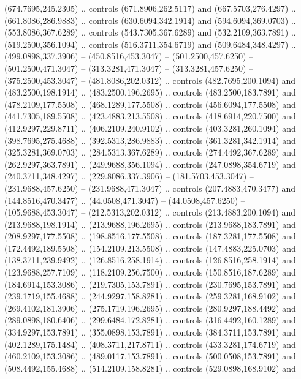 {{\begin{scope}[y=-0.80pt,x=0.80pt,scale=0.038,xshift=-420pt,yshift=250pt]
        (674.7695,245.2305) .. controls (671.8906,262.5117) and (667.5703,276.4297) ..
        (661.8086,286.9883) .. controls (630.6094,342.1914) and (594.6094,369.0703) ..
        (553.8086,367.6289) .. controls (543.7305,367.6289) and (532.2109,363.7891) ..
        (519.2500,356.1094) .. controls (516.3711,354.6719) and (509.6484,348.4297) ..
        (499.0898,337.3906) -- (450.8516,453.3047) -- (501.2500,457.6250) --
        (501.2500,471.3047) -- (313.3281,471.3047) -- (313.3281,457.6250) --
        (375.2500,453.3047) -- (481.8086,202.0312) .. controls (482.7695,200.1094) and
        (483.2500,198.1914) .. (483.2500,196.2695) .. controls (483.2500,183.7891) and
        (478.2109,177.5508) .. (468.1289,177.5508) .. controls (456.6094,177.5508) and
        (441.7305,189.5508) .. (423.4883,213.5508) .. controls (418.6914,220.7500) and
        (412.9297,229.8711) .. (406.2109,240.9102) .. controls (403.3281,260.1094) and
        (398.7695,275.4688) .. (392.5313,286.9883) .. controls (361.3281,342.1914) and
        (325.3281,369.0703) .. (284.5313,367.6289) .. controls (274.4492,367.6289) and
        (262.9297,363.7891) .. (249.9688,356.1094) .. controls (247.0898,354.6719) and
        (240.3711,348.4297) .. (229.8086,337.3906) -- (181.5703,453.3047) --
        (231.9688,457.6250) -- (231.9688,471.3047) .. controls (207.4883,470.3477) and
        (144.8516,470.3477) .. (44.0508,471.3047) -- (44.0508,457.6250) --
        (105.9688,453.3047) -- (212.5313,202.0312) .. controls (213.4883,200.1094) and
        (213.9688,198.1914) .. (213.9688,196.2695) .. controls (213.9688,183.7891) and
        (208.9297,177.5508) .. (198.8516,177.5508) .. controls (187.3281,177.5508) and
        (172.4492,189.5508) .. (154.2109,213.5508) .. controls (147.4883,225.0703) and
        (138.3711,239.9492) .. (126.8516,258.1914) .. controls (126.8516,258.1914) and
        (123.9688,257.7109) .. (118.2109,256.7500) .. controls (150.8516,187.6289) and
        (184.6914,153.3086) .. (219.7305,153.7891) .. controls (230.7695,153.7891) and
        (239.1719,155.4688) .. (244.9297,158.8281) .. controls (259.3281,168.9102) and
        (269.4102,181.3906) .. (275.1719,196.2695) .. controls (280.9297,188.4492) and
        (289.0898,180.6406) .. (299.6484,172.8281) .. controls (316.4492,160.1289) and
        (334.9297,153.7891) .. (355.0898,153.7891) .. controls (384.3711,153.7891) and
        (402.1289,175.1484) .. (408.3711,217.8711) .. controls (433.3281,174.6719) and
        (460.2109,153.3086) .. (489.0117,153.7891) .. controls (500.0508,153.7891) and
        (508.4492,155.4688) .. (514.2109,158.8281) .. controls (529.0898,168.9102) and

\end{scope}}}
